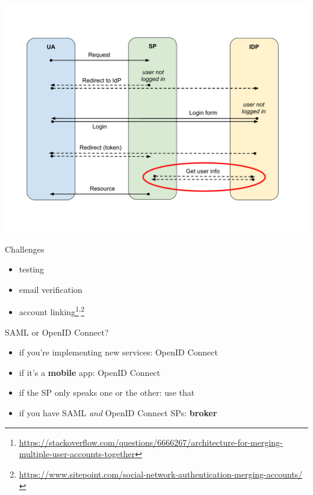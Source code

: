 \documentclass[ignorenonframetext,aspectratio=169]{beamer}
\providecommand{\tightlist}{%
  \setlength{\itemsep}{0pt}\setlength{\parskip}{0pt}}
\begin{document}
\begin{frame}[plain]
\centering
\includegraphics[height=\paperheight]{fedsso-proto-6-getuserinfo.pdf}
\end{frame}

\begin{frame}{Challenges}

\begin{itemize}
\tightlist
\item testing
\item email verification
\item account linking\footnote{
        \url{https://stackoverflow.com/questions/6666267/architecture-for-merging-multiple-user-accounts-together}
    }\textsuperscript{,}\footnote{
        \url{https://www.sitepoint.com/social-network-authentication-merging-accounts/}
    }
\end{itemize}
\end{frame}

\begin{frame}{SAML or OpenID Connect?}
\begin{itemize}
\tightlist
\item if you're implementing new services: OpenID Connect
\item if it's a {\bf mobile} app: OpenID Connect
\item if the SP only speaks one or the other: use that
\item if you have SAML {\em and} OpenID Connect SPs: {\bf broker}
\end{itemize}
\end{frame}
\end{document}
